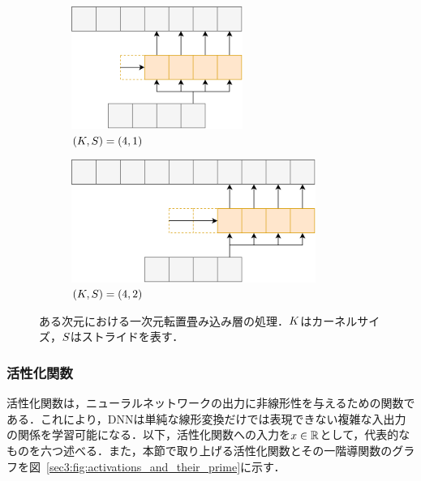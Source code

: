 \documentclass[12pt]{jarticle}
\numberwithin{equation}{section}    %
\numberwithin{figure}{section}      %
\numberwithin{table}{section}      %
\begin{document}
\begin{figure}[tb]
    \centering
    \begin{subfigure}[b]{0.48\textwidth}
        \centering
        \includegraphics[height=4cm]{./figure/sec3/tconv1.drawio.png}
        \caption{$\left(K, S\right) = \left(4, 1\right)$}
        \label{sec3:fig:tconv1}
    \end{subfigure}
    \begin{subfigure}[b]{0.48\textwidth}
        \centering
        \includegraphics[height=4cm]{./figure/sec3/tconv2.drawio.png}
        \caption{$\left(K, S\right) = \left(4, 2\right)$}
        \label{sec3:fig:tconv2}
    \end{subfigure}
    \caption{ある次元における一次元転置畳み込み層の処理．$K$はカーネルサイズ，$S$はストライドを表す．}
    \label{sec3:fig:tconv_variations}
\end{figure}

\subsubsection{活性化関数}
活性化関数は，ニューラルネットワークの出力に非線形性を与えるための関数である．これにより，DNNは単純な線形変換だけでは表現できない複雑な入出力の関係を学習可能になる．以下，活性化関数への入力を$x \in \mathbb{R}$として，代表的なものを六つ述べる．また，本節で取り上げる活性化関数とその一階導関数のグラフを図~\ref{sec3:fig:activations_and_their_prime}に示す．
\end{document}
